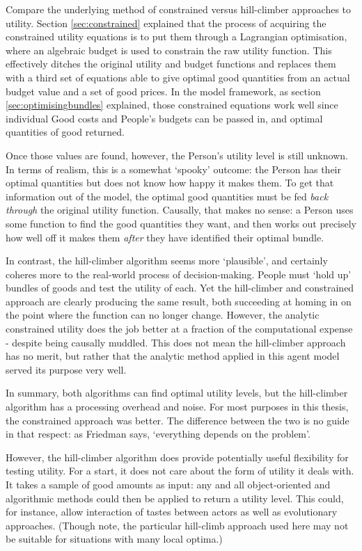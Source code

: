 Compare the underlying method of constrained versus hill-climber approaches to utility. Section \ref{sec:constrained} explained that the process of acquiring the constrained utility equations is to put them through a Lagrangian optimisation, where an algebraic budget is used to constrain the raw utility function. This effectively ditches the original utility and budget functions and replaces them with a third set of equations able to give optimal good quantities from an actual budget value and a set of good prices. In the model framework, as section \ref{sec:optimisingbundles} explained, those constrained equations work well since individual Good costs and People's budgets can be passed in, and optimal quantities of good returned. 

Once those values are found, however, the Person's utility level is still unknown. In terms of realism, this is a somewhat `spooky' outcome: the Person has their optimal quantities but does not know how happy it makes them. To get that information out of the model, the optimal good quantities must be fed \emph{back through} the original utility function. Causally, that makes no sense: a Person uses some function to find the good quantities they want, and then works out precisely how well off it makes them \emph{after} they have identified their optimal bundle.

In contrast, the hill-climber algorithm seems more `plausible', and certainly coheres more to the real-world process of decision-making. People must `hold up' bundles of goods and test the utility of each. Yet the hill-climber and constrained approach are clearly producing the same result, both succeeding at homing in on the point where the function can no longer change. However, the analytic constrained utility does the job better at a fraction of the computational expense - despite being causally muddled. This does not mean the hill-climber approach has no merit, but rather that the analytic method applied in this agent model served its purpose very well. 

In summary, both algorithms can find optimal utility levels, but the hill-climber algorithm has a processing overhead and noise. For most purposes in this thesis, the constrained approach was better. The difference between the two is no guide in that respect: as Friedman says, `everything depends on the problem'. 

However, the hill-climber algorithm does provide potentially useful flexibility for testing utility. For a start, it does not care about the form of utility it deals with. It takes a sample of good amounts as input: any and all object-oriented and algorithmic methods could then be applied to return a utility level. This could, for instance, allow interaction of tastes between actors as well as evolutionary approaches. (Though note, the particular hill-climb approach used here may not be suitable for situations with many local optima.)

